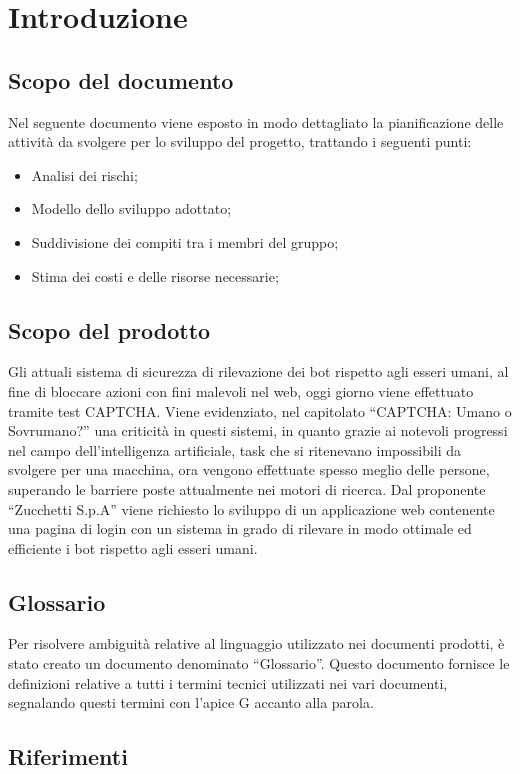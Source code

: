 \section{Introduzione}

\subsection{Scopo del documento}
Nel seguente documento viene esposto in modo dettagliato la pianificazione delle attività da svolgere  per lo sviluppo del progetto, trattando i seguenti punti:
\begin{itemize}
	\item Analisi dei rischi;
	\item Modello dello sviluppo adottato;
	\item Suddivisione dei compiti tra i membri del gruppo;
	\item Stima dei costi e delle risorse necessarie;
\end{itemize}

\subsection{Scopo del prodotto}
Gli attuali sistema di sicurezza di rilevazione dei bot rispetto agli esseri umani, al fine di bloccare azioni con fini malevoli nel web, oggi giorno viene effettuato tramite test CAPTCHA. Viene evidenziato, nel capitolato “CAPTCHA: Umano o Sovrumano?” una criticità in questi sistemi, in quanto grazie ai notevoli progressi nel campo dell’intelligenza artificiale, task che si ritenevano impossibili da svolgere per una macchina, ora vengono effettuate spesso meglio delle persone, superando le barriere poste attualmente nei motori di ricerca.
Dal proponente “Zucchetti S.p.A” viene richiesto lo sviluppo di un applicazione web contenente una pagina di login con un sistema in grado di rilevare in modo ottimale ed efficiente i bot rispetto agli esseri umani.

\subsection{Glossario}
Per risolvere ambiguità relative al linguaggio utilizzato nei documenti prodotti, è stato creato un documento denominato “Glossario”. Questo documento fornisce le definizioni relative a tutti i termini tecnici utilizzati nei vari documenti, segnalando questi termini con l’apice G accanto alla parola.

\subsection{Riferimenti}

